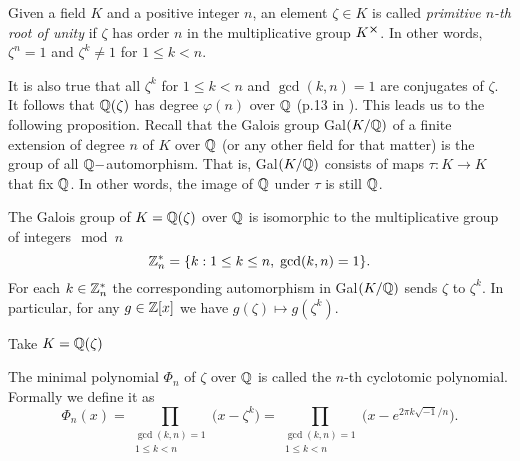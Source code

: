 \begin{definition}
    Given a field $K$ and a positive integer $n$, an element $\zeta \in K$ is called \textit{primitive $n$-th root of unity} if $\zeta$ has order $n$ in the multiplicative group $K^{\cross}$. In other words, $\zeta^n = 1$ and $\zeta^k \neq 1$ for $1 \leq k < n$. 
\end{definition}
It is also true that all $\zeta^k$ for $1 \leq k < n$ and $\gcd(k,n) = 1$ are conjugates of $\zeta$. It follows that $\mathbb{Q}(\zeta)$ has degree $\varphi(n)$ over $\mathbb{Q}$ (p.13 in \cite{algebra}). This leads us to the following proposition. Recall that the Galois group Gal$(K/\mathbb{Q})$ of a finite extension of degree $n$ of $K$ over $\mathbb{Q}$ (or any other field for that matter) is the group of all $\mathbb{Q}-$automorphism. That is, Gal$(K/\mathbb{Q})$ consists of maps $\tau : K \rightarrow K$ that fix $\mathbb{Q}$. In other words, the image of $\mathbb{Q}$ under $\tau$ is still $\mathbb{Q}$. 
\begin{proposition}
	The Galois group of $K = \mathbb{Q}(\zeta)$ over $\mathbb{Q}$ is isomorphic to the multiplicative group of integers$\mod n$
	\[ \mathbb{Z}_n^* = \{ k : 1 \leq k \leq n, \; \gcd(k,n) = 1 \}. \]
	For each $k \in \mathbb{Z}_n^*$ the corresponding automorphism in Gal$(K/\mathbb{Q})$ sends $\zeta$ to $\zeta^k$. In particular, for any $g \in \mathbb{Z}[x]$ we have $g(\zeta) \mapsto g(\zeta^k)$.
\end{proposition}
\begin{example}
	Take $K = \mathbb{Q}(\zeta)$
\end{example}

The minimal polynomial $\Phi_n$ of $\zeta$ over $\mathbb{Q}$ is called the $n$-th cyclotomic polynomial. Formally we define it as 
\[ \Phi_n(x) = \prod_{\substack{\gcd(k,n) = 1 \\ 1 \leq k < n}} \bigg( x - \zeta^k \bigg) = \prod_{\substack{\gcd(k,n) = 1 \\ 1 \leq k < n}} \bigg( x - e^{2\pi k \sqrt{-1}/n} \bigg). \]

